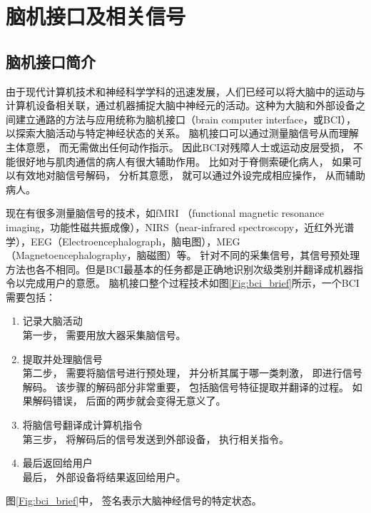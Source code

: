 \chapter{脑机接口及相关信号}

\section{脑机接口简介}

由于现代计算机技术和神经科学学科的迅速发展，人们已经可以将大脑中的运动与计算机设备相关联，通过机器捕捉大脑中神经元的活动\cite{wolpaw2002brain}。这种为大脑和外部设备之间建立通路的方法与应用统称为脑机接口（brain computer interface，或BCI）\cite{van2009brain,donoghue2002connecting}，以探索大脑活动与特定神经状态的关系。 脑机接口可以通过测量脑信号从而理解主体意愿， 而无需做出任何动作指示\cite{kostov2000parallel,allison2007brain,birbaumer2007brain}。 因此BCI对残障人士或运动皮层受损， 不能很好地与肌肉通信的病人有很大辅助作用。 比如对于脊侧索硬化\cite{allison2007brain}病人， 如果可以有效地对脑信号解码， 分析其意愿， 就可以通过外设完成相应操作， 从而辅助病人。 

现在有很多测量脑信号的技术，如fMRI （functional magnetic resonance imaging，功能性磁共振成像），NIRS（near-infrared spectroscopy，近红外光谱学），EEG（Electroencephalograph，脑电图），MEG（Magnetoencephalography，脑磁图）等。 针对不同的采集信号，其信号预处理方法也各不相同。但是BCI最基本的任务都是正确地识别次级类别并翻译成机器指令以完成用户的意愿。 脑机接口整个过程技术如图\ref{Fig:bci_brief}所示\cite{farwell1988talking}，一个BCI需要包括：

\begin{enumerate}
\item{记录大脑活动}\\
	第一步， 需要用放大器采集脑信号。 
\item{提取并处理脑信号}\\
	第二步， 需要将脑信号进行预处理， 并分析其属于哪一类刺激， 即进行信号解码。 该步骤的解码部分非常重要， 包括脑信号特征提取并翻译的过程。 如果解码错误， 后面的两步就会变得无意义了。
\item{将脑信号翻译成计算机指令}\\
	第三步， 将解码后的信号发送到外部设备， 执行相关指令。
\item{最后返回给用户}\\
	最后， 外部设备将结果返回给用户。
\end{enumerate}

图\ref{Fig:bci_brief}中， 签名表示大脑神经信号的特定状态。 

